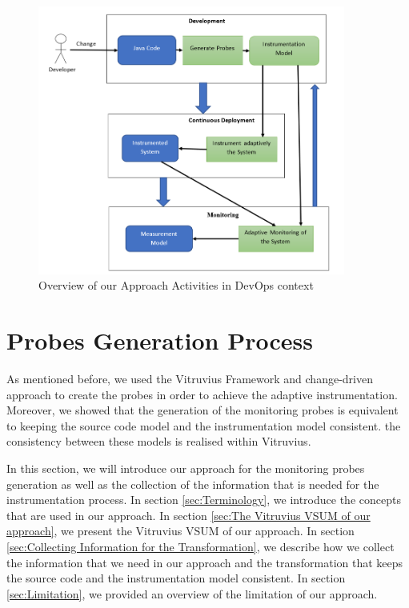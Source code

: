 \begin{figure}[h]
\centering
\includegraphics[width=0.9\textwidth]{figures/devops_approach}
\caption{Overview of our Approach Activities in DevOps context}
\label{fig:devops_approach}
\end{figure}

\section{Probes Generation Process}
\label{sec:Monitoring Probes Generation Process}
As mentioned before, we used the Vitruvius Framework and change-driven approach to create the probes in order to achieve the adaptive instrumentation. Moreover, we showed that the generation of the monitoring probes is equivalent to keeping the source code model and the instrumentation model consistent. the consistency between these models is realised within Vitruvius.

In this section, we will introduce our approach for the monitoring probes generation as well as the collection of the information that is needed for the instrumentation process. In section \ref{sec:Terminology}, we introduce the concepts that are used in our approach. In section \ref{sec:The Vitruvius VSUM of our approach}, we present the Vitruvius VSUM of our approach. In section \ref{sec:Collecting Information for the Transformation}, we describe how we collect the information that we need in our approach and the transformation that keeps the source code and the instrumentation model consistent. In section \ref{sec:Limitation}, we provided an overview of the limitation of our approach.

